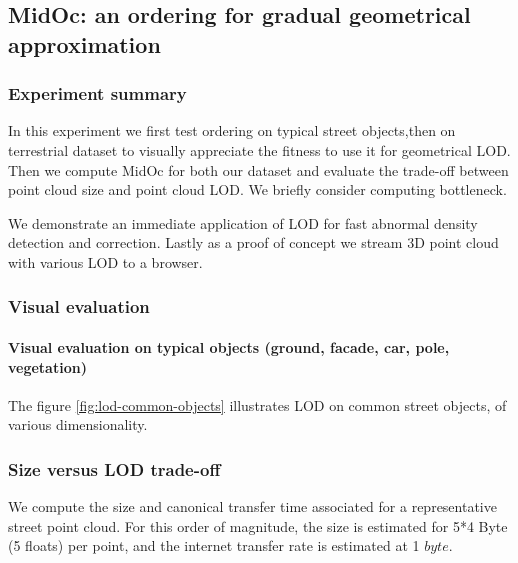 	\subsection{MidOc: an ordering for gradual geometrical approximation}
		\subsubsection{Experiment summary}
			In this experiment we first test ordering on typical street objects,then on terrestrial dataset to visually appreciate the fitness to use it for geometrical LOD.
			Then we compute MidOc for both our dataset and evaluate the trade-off between point cloud size and point cloud LOD.
			We briefly consider computing bottleneck.
			
			We demonstrate an immediate application of LOD for fast abnormal density detection and correction.
			Lastly as a proof of concept we stream 3D point cloud with various LOD to a browser.
		
		\subsubsection{Visual evaluation}
			
			\paragraph{Visual evaluation on typical objects (ground, facade, car, pole, vegetation)}
				The figure \ref{fig:lod-common-objects} illustrates LOD on common street objects, of various dimensionality.
		
		\subsubsection{Size versus LOD trade-off}
			We compute the size and canonical transfer time associated for a representative street point cloud.
			For this order of magnitude, the size is estimated for 5*4 Byte (5 floats) per point, and the internet transfer rate is estimated at 1 \mega $byte$\per \second.
			
